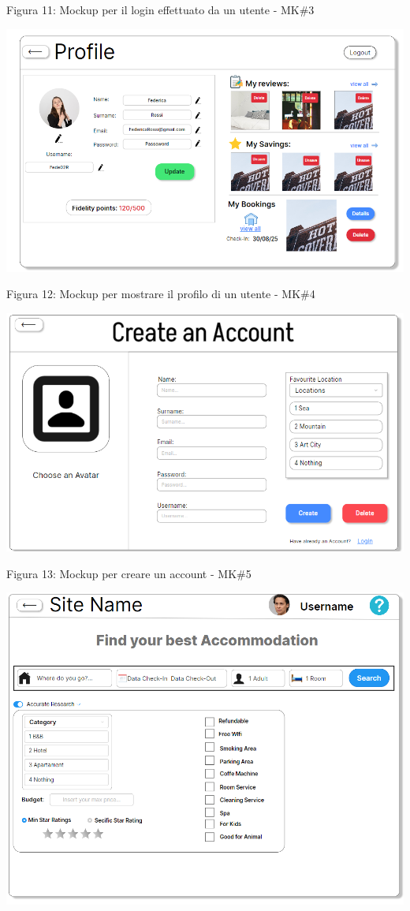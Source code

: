 \documentclass[10pt]{article}
\begin{document}
\begin{center}
\par\medskip
Figura 11: Mockup per il login effettuato da un utente - MK\#3
\par\medskip
\includegraphics[scale=0.6]{Mockup/MockupProfile}
\par\medskip
Figura 12: Mockup per mostrare il profilo di un utente - MK\#4
\par\medskip
\includegraphics[scale=0.6]{Mockup/MockupRegister}
\par\medskip
\par\medskip
Figura 13: Mockup per creare un account - MK\#5
\par\medskip
\par\medskip
\includegraphics[scale=0.5]{Mockup/MockupResearch}

\end{center}
\end{document}
